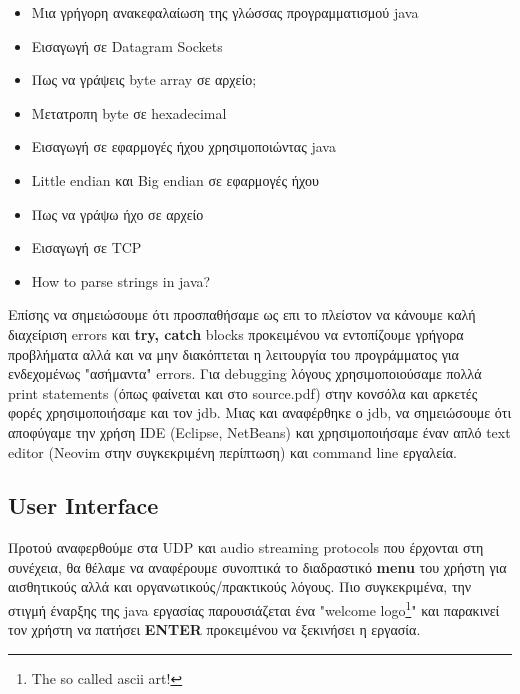 \documentclass[hidelinks, 12pt, a4paper]{article}
\begin{document}
\begin{itemize}
    \item Μια γρήγορη ανακεφαλαίωση της γλώσσας προγραμματισμού java \cite{derek}
    \item Εισαγωγή σε Datagram Sockets \cite{romaniancoder, oracle}
    \item Πως να γράψεις byte array σε αρχείο; \cite{javafile}
    \item Μετατροπη byte σε hexadecimal \cite{programizhex}
    \item Εισαγωγή σε εφαρμογές ήχου χρησιμοποιώντας java \cite{oraclesound}
    \item Little endian και Big endian σε εφαρμογές ήχου \cite{stackendian}
    \item Πως να γράψω ήχο σε αρχείο \cite{stackaudiofile}
    \item Εισαγωγή σε TCP \cite{tutorpoints, mediumtcp, codejava}
    \item How to parse strings in java? \cite{stackparsestring}
\end{itemize}


Επίσης να σημειώσουμε ότι προσπαθήσαμε ως επι το πλείστον να κάνουμε καλή διαχείριση errors και \textbf{try, catch} blocks προκειμένου να εντοπίζουμε γρήγορα προβλήματα αλλά και να μην διακόπτεται η λειτουργία του προγράμματος για ενδεχομένως "ασήμαντα" errors. Για debugging λόγους χρησιμοποιούσαμε πολλά print statements (όπως φαίνεται και στο source.pdf) στην κονσόλα και αρκετές φορές χρησιμοποιήσαμε και τον jdb. Μιας και αναφέρθηκε ο jdb, να σημειώσουμε ότι αποφύγαμε την χρήση IDE (Eclipse, NetBeans) και χρησιμοποιήσαμε έναν απλό text editor (Neovim στην συγκεκριμένη περίπτωση) και command line εργαλεία.

\subsection{User Interface}

Προτού αναφερθούμε στα UDP και audio streaming protocols που έρχονται στη συνέχεια, θα θέλαμε να αναφέρουμε συνοπτικά το διαδραστικό \textbf{menu} του χρήστη για αισθητικούς αλλά και οργανωτικούς/πρακτικούς λόγους. Πιο συγκεκριμένα, την στιγμή έναρξης της java εργασίας παρουσιάζεται ένα "welcome logo\footnote{The so called ascii art!}" και παρακινεί τον χρήστη να πατήσει \textbf{ENTER} προκειμένου να ξεκινήσει η εργασία.
\end{document}
